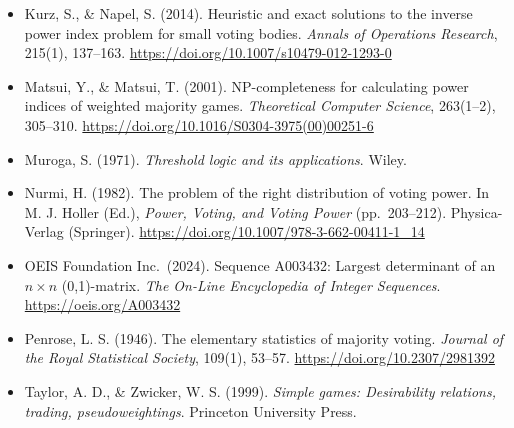 \documentclass[
]{article}
\begin{document}
\begin{itemize}
  \url{https://doi.org/10.1007/s00355-015-0946-8}
\item
  Kurz, S., \& Napel, S. (2014). Heuristic and exact solutions to the
  inverse power index problem for small voting bodies. \emph{Annals of
  Operations Research}, 215(1), 137--163.
  \url{https://doi.org/10.1007/s10479-012-1293-0}
\item
  Matsui, Y., \& Matsui, T. (2001). NP-completeness for calculating
  power indices of weighted majority games. \emph{Theoretical Computer
  Science}, 263(1--2), 305--310.
  \url{https://doi.org/10.1016/S0304-3975(00)00251-6}
\item
  Muroga, S. (1971). \emph{Threshold logic and its applications}. Wiley.
\item
  Nurmi, H. (1982). The problem of the right distribution of voting
  power. In M. J. Holler (Ed.), \emph{Power, Voting, and Voting Power}
  (pp.~203--212). Physica-Verlag (Springer).
  \url{https://doi.org/10.1007/978-3-662-00411-1_14}
\item
  OEIS Foundation Inc.~(2024). Sequence A003432: Largest determinant of
  an \(n\times n\) (0,1)-matrix. \emph{The On-Line Encyclopedia of
  Integer Sequences}. \url{https://oeis.org/A003432}
\item
  Penrose, L. S. (1946). The elementary statistics of majority voting.
  \emph{Journal of the Royal Statistical Society}, 109(1), 53--57.
  \url{https://doi.org/10.2307/2981392}
\item
  Taylor, A. D., \& Zwicker, W. S. (1999). \emph{Simple games:
  Desirability relations, trading, pseudoweightings}. Princeton
  University Press.
\end{itemize}
\end{document}
